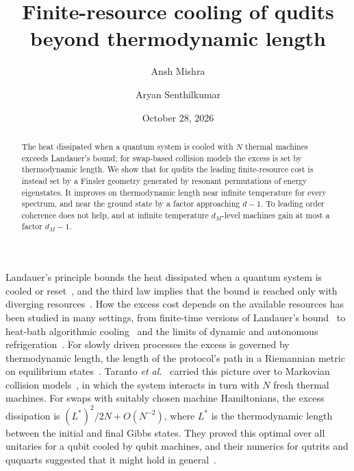 \documentclass[aps,prl,reprint,superscriptaddress,amsmath,amssymb]{revtex4-2}
\begin{document}
\raggedbottom

\title{Finite-resource cooling of qudits beyond thermodynamic length}

\author{Ansh Mishra}
\author{Aryan Senthilkumar}

\date{October 28, 2026}

\begin{abstract}
The heat dissipated when a quantum system is cooled with $N$ thermal machines exceeds Landauer's bound; for
swap-based collision models the excess is set by thermodynamic length. We show that for qudits the leading
finite-resource cost is instead set by a Finsler geometry generated by resonant permutations of energy eigenstates. It
improves on thermodynamic length near infinite temperature for every spectrum, and near the ground state by a factor
approaching $d-1$. To leading order coherence does not help, and at infinite temperature $d_M$-level machines gain at
most a factor $d_M-1$.
\end{abstract}

\maketitle

Landauer's principle bounds the heat dissipated when a quantum system is cooled or reset~\cite{Landauer1961,ReebWolf2014},
and the third law implies that the bound is reached only with diverging resources~\cite{Masanes2017,Wilming2017,Taranto2023}.
How the excess cost depends on the available resources has been studied in many settings, from finite-time versions of
Landauer's bound~\cite{Proesmans2020,VanVuSaito2022,Rolandi2023} to heat-bath algorithmic
cooling~\cite{Boykin2002,Baugh2005,RaeisiMosca2015,RodriguezBriones2016} and the limits of dynamic and autonomous
refrigeration~\cite{Allahverdyan2011,Silva2016,Clivaz2019}. For slowly driven processes the excess is governed by
thermodynamic length, the length of the protocol's path in a Riemannian metric on equilibrium
states~\cite{Salamon1983,Nulton1985,Crooks2007,SivakCrooks2012,Scandi2019,Abiuso2020}. Taranto \emph{et
al.}~\cite{Taranto2025} carried this picture over to Markovian collision models~\cite{Scarani2002,Ciccarello2022}, in
which the system interacts in turn with $N$ fresh thermal machines. For swaps with suitably chosen machine Hamiltonians,
the excess dissipation is $(L^*)^2/2N+O(N^{-2})$, where $L^*$ is the thermodynamic length between the initial and final
Gibbs states. They proved this optimal over all unitaries for a qubit cooled by qubit machines, and their numerics for
qutrits and ququarts suggested that it might hold in general~\cite{Taranto2025}.
\end{document}
